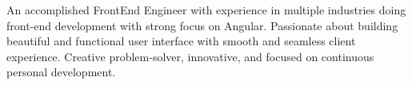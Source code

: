 

\begin{cvparagraph}

An accomplished FrontEnd Engineer with experience in multiple industries doing front-end development with strong focus on Angular. Passionate about building beautiful and functional user interface with smooth and seamless client experience. Creative problem-solver, innovative, and focused on continuous personal development.

\end{cvparagraph}
